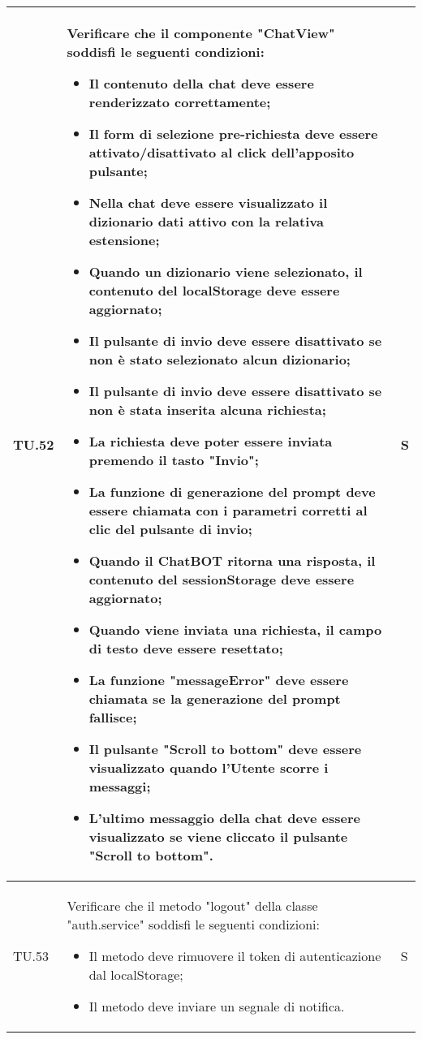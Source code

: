 \begin{adjustwidth}{-0.5cm}{-0.5cm}
\begin{longtable}{|P{1.5cm}|>{\raggedright}P{9.5cm}|>{\arraybackslash}P{1.5cm}|}
		\hline TU.52 & Verificare che il componente "ChatView" soddisfi le seguenti condizioni:
    \begin{itemize}
      \item Il contenuto della chat deve essere renderizzato correttamente;
			\item Il form di selezione pre-richiesta deve essere attivato/disattivato al click dell'apposito pulsante;
			\item Nella chat deve essere visualizzato il dizionario dati attivo con la relativa estensione;
			\item Quando un dizionario viene selezionato, il contenuto del localStorage deve essere aggiornato;
			\item Il pulsante di invio deve essere disattivato se non è stato selezionato alcun dizionario;
			\item Il pulsante di invio deve essere disattivato se non è stata inserita alcuna richiesta;
			\item La richiesta deve poter essere inviata premendo il tasto "Invio";
			\item La funzione di generazione del prompt deve essere chiamata con i parametri corretti al clic del pulsante di invio;
			\item Quando il ChatBOT ritorna una risposta, il contenuto del sessionStorage deve essere aggiornato;
			\item Quando viene inviata una richiesta, il campo di testo deve essere resettato;
			\item La funzione "messageError" deve essere chiamata se la generazione del prompt fallisce;
			\item Il pulsante "Scroll to bottom" deve essere visualizzato quando l'Utente scorre i messaggi;
			\item L'ultimo messaggio della chat deve essere visualizzato se viene cliccato il pulsante "Scroll to bottom".
    \end{itemize} & S \\

		\hline TU.53 & Verificare che il metodo "logout" della classe "auth.service" soddisfi le seguenti condizioni:
		\begin{itemize}
			\item Il metodo deve rimuovere il token di autenticazione dal localStorage;
			\item Il metodo deve inviare un segnale di notifica.
    \end{itemize} & S \\


\end{longtable}
\end{adjustwidth}
